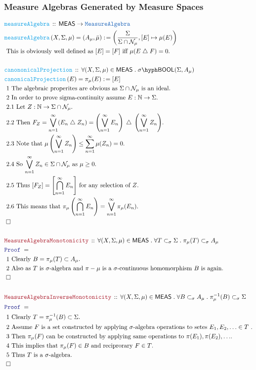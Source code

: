 \documentclass[12pt]{scrartcl}
\newcommand{\TYPE}[1]{\textcolor{NavyBlue}{\mathtt{#1}}}
\newcommand{\FUNC}[1]{\textcolor{Cerulean}{\mathtt{#1}}}
\newcommand{\LOGIC}[1]{\textcolor{Blue}{\mathtt{#1}}}
\newcommand{\THM}[1]{\textcolor{Maroon}{\mathtt{#1}}}
\renewcommand{\.}{\; . \;}
\newcommand{\de}{: \kern 0.1pc =}
\newcommand{\Act}[1]{\left( #1 \right)}
\newcommand{\Theorem}[2]{& \THM{#1} \, :: \, #2 \\ & \Proof = \\ }
\newcommand{\DeclareFunc}[2]{& \FUNC{#1} \, :: \, #2 \\}
\newcommand{\DefineNamedFunc}[4]{&  \FUNC{#1}\Act{#2} = #3 \de #4 \\}
\newcommand{\Page}[1]{ \begin{align*} #1 \end{align*}   }
\newcommand{\Nat}{\mathbb{N} }
\newcommand{\du}{\; \triangle \;}
\newcommand{\QED}{\; \square}
\newcommand{\EndProof}{& \QED \\}
\newcommand{\Proof}{\LOGIC{Proof} \; }
\newcommand{\Explain}[1]{& \text{#1.} \\}
\newcommand{\BOOL}{\mathsf{BOOL}}
\newcommand{\Null}{\mathcal{N}}
\newcommand{\MEAS}{\mathsf{MEAS}}
\newcommand{\MA}{\TYPE{MeasureAlgebra}}
\begin{document}
\subsubsection{Measure Algebras Generated by Measure Spaces}
\Page{
	\DeclareFunc{measureAlgebra}
	{
		\MEAS \to \MA
	}
	\DefineNamedFunc{measureAlgebra}{X,\Sigma,\mu}{(A_\mu,\bar \mu)}
	{\left( \frac{\Sigma}{\Sigma \cap \Null_\mu},[E] \mapsto \mu(E)\right)}
	\Explain{ This is obviously well defined as $[E] = [F]$ iff $\mu(E \du F) = 0$}
	\\
	\DeclareFunc{canononicalProjection}
	{
		\forall (X,\Sigma,\mu) \in \MEAS \. 
		\sigma\hyph\BOOL(\Sigma,A_\mu) 
	}
	\DefineNamedFunc{canonicalProjection}{E}{\pi_\mu(E)}{[E]}
	\Explain{ 1 The algebraic properites are obvious as $\Sigma \cap \Null_\mu$ is an ideal}
	\Explain{ 2 In order to prove sigma-continuity assume $E : \Nat \to \Sigma$}
	\Explain{ 2.1 Let $Z : \Nat \to \Sigma \cap \Null_\mu$}
	\Explain{ 2.2 Then $F_Z = \bigvee^\infty_{n=1} (E_n \du Z_n) = 
		\left(\bigvee^\infty_{n=1} E_n\right) \du \left( \bigvee^\infty_{n=1} Z_n\right)$}
	\Explain{ 2.3 Note that 
	$\mu\left( \bigvee^\infty_{n=1} Z_n\right) \le \sum^\infty_{n=1} \mu(Z_n)=0$}
	\Explain{ 2.4 So $ \bigvee^\infty_{n=1} Z_n \in \Sigma \cap \Null_\mu$ as $\mu \ge 0$}
	\Explain{ 2.5 Thus $[F_Z] = \left[\bigcap^\infty_{n=1} E_n\right]$ for any selection of $Z$}
	\Explain{ 2.6 This means that 
			$\pi_\mu\left(\bigcap^\infty_{n=1} E_n\right) = \bigvee^\infty_{n=1} \pi_\mu(E_n)$}
	\EndProof
	\\
	\Theorem{MeasureAlgebraMonotonicity}
	{
		\forall (X,\Sigma,\mu) \in \MEAS \.
		\forall T \subset_\sigma \Sigma \.
		\pi_\mu(T) \subset_\sigma A_\mu
	}
	\Explain{ 1 Clearly $B = \pi_\mu(T) \subset A_\mu$}
	\Explain{ 2 Also as $T$ is $\sigma$-algebra and $\pi-\mu$ is a $\sigma$-continuous homomorphism 
		$B$ is again}
	\EndProof
	\\
	\Theorem{MeasureAlgebraInverseMonotonicity}
	{
		\forall (X,\Sigma,\mu) \in \MEAS \.
		\forall B \subset_\sigma A_\mu \.
		\pi_\mu^{-1}(B) \subset_\sigma \Sigma
	}
	\Explain{ 1 Clearly $T = \pi_\mu^{-1}(B) \subset \Sigma$}
	\Explain{ 2 Assume $F$ is a set constructed by applying $\sigma$-algebra operations to setes $E_1,E_2,\ldots \in T$ }
	\Explain{ 3 Then $\pi_\mu(F)$ can be constructed by applying same operations to $\pi(E_1),\pi(E_2),\ldots$}
	\Explain{ 4 This implies that $\pi_\mu(F) \in B$ and reciprorary $F \in T$}
	\Explain{ 5 Thus $T$ is a $\sigma$-algebra}
	\EndProof
}
\newpage
\end{document}
